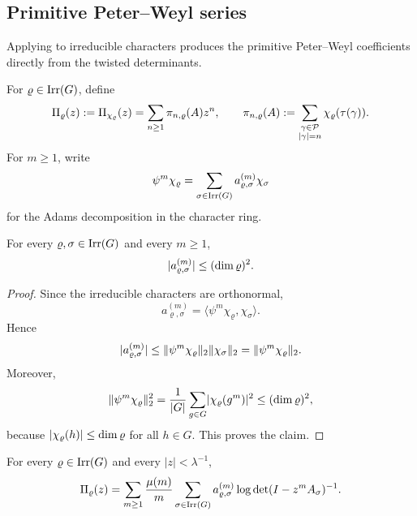 \subsection{Primitive Peter--Weyl series}

Applying  to irreducible
characters produces the primitive Peter--Weyl coefficients directly
from the twisted determinants.

For \(\varrho\in\operatorname{Irr}(G)\), define
\begin{equation}\label{eq:primitive-peter-weyl-series}
  \Pi_\varrho(z):=\Pi_{\chi_\varrho}(z)
  =\sum_{n\ge 1}\pi_{n,\varrho}(A)z^n,
  \qquad
  \pi_{n,\varrho}(A)
  :=\sum_{\substack{\gamma\in\mathcal P\\ |\gamma|=n}}
    \chi_\varrho(\tau(\gamma)).
\end{equation}
For \(m\ge 1\), write
\begin{equation}\label{eq:adams-character-decomposition}
  \psi^m\chi_\varrho
  =\sum_{\sigma\in\operatorname{Irr}(G)}a_{\varrho,\sigma}^{(m)}\chi_\sigma
\end{equation}
for the Adams decomposition in the character ring.

\begin{lemma}\label{lem:adams-coefficients-bounded}
  For every \(\varrho,\sigma\in\operatorname{Irr}(G)\) and every \(m\ge 1\),
  \[
    \lvert a_{\varrho,\sigma}^{(m)} \rvert\le (\dim\varrho)^2.
  \]
\end{lemma}

\begin{proof}
  Since the irreducible characters are orthonormal,
  \[
    a_{\varrho,\sigma}^{(m)}
    =\langle \psi^m\chi_\varrho,\chi_\sigma\rangle.
  \]
  Hence
  \[
    \lvert a_{\varrho,\sigma}^{(m)} \rvert
    \le \lVert \psi^m\chi_\varrho \rVert_2\lVert \chi_\sigma \rVert_2
    =\lVert \psi^m\chi_\varrho \rVert_2.
  \]
  Moreover,
  \[
    \lVert \psi^m\chi_\varrho \rVert_2^2
    =\frac{1}{|G|}\sum_{g\in G}\lvert \chi_\varrho(g^m) \rvert^2
    \le (\dim\varrho)^2,
  \]
  because \(\lvert \chi_\varrho(h) \rvert\le \dim\varrho\) for all \(h\in G\).
  This proves the claim.
\end{proof}

\begin{corollary}
  \label{cor:primitive-peter-weyl-determinant}
  For every \(\varrho\in\operatorname{Irr}(G)\) and every \(|z|<\lambda^{-1}\),
  \begin{equation}\label{eq:primitive-peter-weyl-determinant}
    \Pi_\varrho(z)
    =
    \sum_{m\ge 1}\frac{\mu(m)}{m}
      \sum_{\sigma\in\operatorname{Irr}(G)}
        a_{\varrho,\sigma}^{(m)}
        \log\det(I-z^mA_\sigma)^{-1}.
  \end{equation}
\end{corollary}

